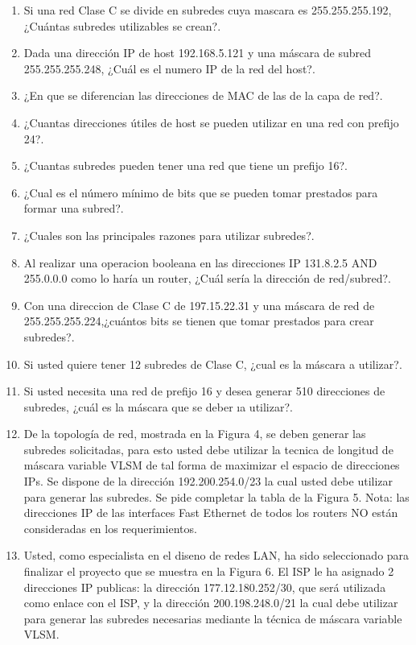 \documentclass{udparticle}
\begin{document}
\begin{enumerate}
\item Si una red Clase C se divide en subredes cuya mascara es 255.255.255.192, ¿Cuántas subredes utilizables se crean?.
\item Dada una dirección IP de host 192.168.5.121 y una máscara de 
subred 255.255.255.248, ¿Cuál es el numero IP de la red del host?.
\item ¿En que se diferencian las direcciones de MAC de las de la capa de red?.
\item ¿Cuantas direcciones útiles de host se pueden utilizar en una red con prefijo 24?.
\item ¿Cuantas subredes pueden tener una red que tiene un prefijo 16?.
\item ¿Cual es el número mínimo de bits que se pueden tomar prestados para formar una subred?.
\item ¿Cuales son las principales razones para utilizar subredes?.
\item Al realizar una operacion booleana en las direcciones IP 131.8.2.5
AND 255.0.0.0 como lo haría un router, ¿Cuál sería la dirección de 
red/subred?.
\item Con una direccion de Clase C de 197.15.22.31 y una máscara de red 
de 255.255.255.224,¿cuántos bits se tienen que tomar prestados para 
crear subredes?.
\item Si usted quiere tener 12 subredes de Clase C, ¿cual es la máscara 
a utilizar?.
\item Si usted necesita una red de prefijo 16 y desea generar 510 
direcciones de subredes, ¿cuál es la máscara que se deber ıa utilizar?.
\item De la topología de red, mostrada en la Figura 4, se deben generar 
las subredes solicitadas, para esto usted debe utilizar la tecnica de 
longitud de máscara variable VLSM de tal forma de maximizar el espacio 
de direcciones IPs. Se dispone de la dirección 192.200.254.0/23 la cual 
usted debe utilizar para generar las subredes. Se pide completar la 
tabla de la Figura 5. Nota: las direcciones IP de las interfaces Fast 
Ethernet de todos los routers NO están consideradas en los requerimientos.
\item Usted, como especialista en el diseno de redes LAN, ha sido seleccionado para
finalizar el proyecto que se muestra en la Figura 6. El ISP le ha asignado 2 
direcciones IP publicas: la dirección 177.12.180.252/30, que será utilizada como 
enlace con el ISP, y la dirección 200.198.248.0/21 la cual debe utilizar para 
generar las subredes necesarias mediante la técnica de máscara variable VLSM.

\end{enumerate}
\end{document}
